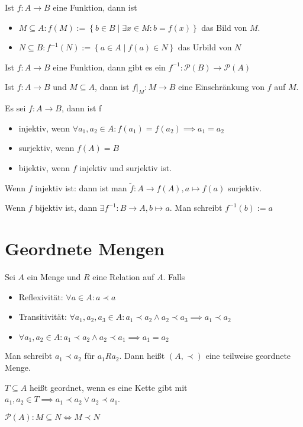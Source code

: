 \begin{definition}
  Ist $f: A \to B$ eine Funktion, dann ist
  \begin{itemize}
  \item $M \subseteq A: f(M) := \left\{ b \in B \middle| \exists x \in M: b = f(x) \right\}$ das Bild von $M$.
  \item $N \subseteq B: f^{-1}(N) := \left\{ a \in A \middle| f(a) \in N \right\}$ das Urbild von $N$
  \end{itemize}

  Ist $f: A \to B$ eine Funktion, dann gibt es ein $f^{-1}: \mathscr{P}(B) \to \mathscr{P}(A)$

  Ist $f: A \to B$ und $M \subseteq A$, dann ist $f|_M: M \to B$ eine Einschränkung von $f$ auf $M$.
\end{definition}

\begin{definition}
  Es sei $f: A \to B$, dann ist f
  \begin{itemize}
  \item injektiv, wenn $\forall a_1, a_2 \in A: f(a_1) = f(a_2) \implies a_1 = a_2$
  \item surjektiv, wenn $f(A) = B$
  \item bijektiv, wenn $f$ injektiv und surjektiv ist.
  \end{itemize}

  Wenn $f$ injektiv ist: dann ist man $\tilde{f}: A \to f(A), a \mapsto f(a)$ surjektiv.

  Wenn $f$ bijektiv ist, dann $\exists f^{-1}: B \to A, b \mapsto a$. Man schreibt $f^{-1}(b) := a$
\end{definition}

\section{Geordnete Mengen}
\begin{definition}
  Sei $A$ ein Menge und $R$ eine Relation auf $A$. Falls
  \begin{itemize}
  \item Reflexivität: $\forall a \in A: a \prec a$
  \item Transitivität: $\forall a_1, a_2, a_3 \in A: a_1 \prec a_2 \wedge a_2 \prec a_3 \implies a_1 \prec a_2$
  \item $\forall a_1, a_2 \in A: a_1 \prec a_2 \wedge a_2 \prec a_1 \implies a_1 = a_2$
  \end{itemize}

  Man schreibt $a_1 \prec a_2$ für $a_1 R a_2$. Dann heißt $(A, \prec)$ eine teilweise geordnete Menge.

  $T \subseteq A$ heißt geordnet, wenn es eine Kette gibt mit $a_1, a_2 \in T \implies a_1 \prec a_2 \vee a_2 \prec a_1$.
\end{definition}
\begin{example}
  $\mathscr{P}(A): M \subseteq N \iff M \prec N$
\end{example}